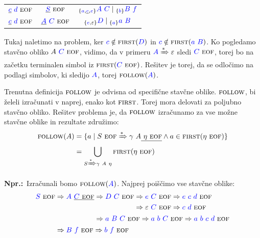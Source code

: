 \documentclass{article}
\newcommand{\Ex}{\textbf{Npr.:}\ }
\newcommand{\FIRST}{\textsc{first}}
\newcommand{\FOLLOW}{\textsc{follow}}
\newcommand{\EOF}{\textsc{eof}}
\newcommand{\Symbol}[1]{\textcolor{blue}{#1}}
\newcommand{\Null}{\varepsilon}
\newcommand{\Derive}{\Rightarrow}
\newcommand{\DeriveStar}{\xRightarrow{\ast}}
\newcommand{\Seq}{\ }
\newcommand{\Union}{\mathrel{|}}
\newcommand{\Lookahead}[1]{{}_{\{{#1}\}}}
\begin{document}
\begin{center}
\begin{tabular}{|c|c|c|}
  \hline
  $\underline{\Symbol{c}} \Seq \Symbol{d} \Seq \EOF$ & $\underline{\Symbol{S}} \Seq \EOF$ & $\Lookahead{\Symbol{a}, \underline{\Symbol{c}}, \Symbol{e}} \Symbol{A} \Seq \Symbol{C} \Union \Lookahead{\Symbol{b}} \Symbol{B} \Seq \Symbol{f}$ \\ 
  $\underline{\Symbol{c}} \Seq \Symbol{d} \Seq \EOF$ & $\underline{\Symbol{A}} \Seq \Symbol{C} \Seq \EOF$ & $\Lookahead{\Symbol{e}, \Null} \Symbol{D} \Union \Lookahead{\Symbol{a}} \Symbol{a} \Seq \Symbol{B}$ \\ 
  \hline
\end{tabular}
\end{center}
Tukaj naletimo na problem, ker $\Symbol{c} \notin \FIRST(\Symbol{D})$ in $\Symbol{c} \notin \FIRST(\Symbol{a} \Seq \Symbol{B})$.
Ko pogledamo stavčno obliko $A \Seq \Symbol{C} \Seq \EOF$, vidimo, da v primeru $\Symbol{A} \DeriveStar \varepsilon$ sledi $\Symbol{C} \Seq \EOF$, torej bo na začetku terminalen simbol iz $\FIRST(\Symbol{C} \Seq \EOF)$.
Rešitev je torej, da se odločimo na podlagi simbolov, ki sledijo $\Symbol{A}$, torej $\FOLLOW(\Symbol{A})$.

Trenutna definicija $\FOLLOW$ je odvisna od specifične stavčne oblike.
$\FOLLOW$, bi želeli izračunati v naprej, enako kot $\FIRST$.
Torej mora delovati za poljubno stavčno obliko.
Rešitev problema je, da $\FOLLOW$ izračunamo za vse možne stavčne oblike in rezultate združimo:
\begin{align*}
  \FOLLOW(A) &= \{a \mid S \Seq \EOF \DeriveStar \gamma \Seq A \underline{\Seq \eta \Seq \EOF} \land a \in \FIRST(\eta \Seq \EOF)\}\\
  &= \bigcup_{S \DeriveStar \gamma \Seq A \Seq \eta} \FIRST(\eta \Seq \EOF)
\end{align*}

\Ex Izračunali bomo $\FOLLOW(\Symbol{A})$.
Najprej poiščimo vse stavčne oblike:
\begin{equation*}
  \Symbol{S} \Seq \EOF \begin{aligned}[t]
    &\Derive \Symbol{A} \Seq \underline{\Symbol{C} \Seq \EOF} \begin{aligned}[t]
      &\Derive \Symbol{D} \Seq \Symbol{C} \Seq \EOF \begin{aligned}[t]
        &\Derive \Symbol{e} \Seq \Symbol{C} \Seq \EOF \Derive \Symbol{e} \Seq \Symbol{c} \Seq \Symbol{d} \Seq \EOF \\
        &\Derive \Null \Seq \Symbol{C} \Seq \EOF \Derive \Symbol{c} \Seq \Symbol{d} \Seq \EOF \\
      \end{aligned}\\
      &\Derive \Symbol{a} \Seq \Symbol{B} \Seq \Symbol{C} \Seq \EOF \Derive \Symbol{a} \Seq \Symbol{b} \Seq \Symbol{C} \Seq \EOF \Derive \Symbol{a} \Seq \Symbol{b} \Seq \Symbol{c} \Seq \Symbol{d} \Seq \EOF
    \end{aligned}\\
    &\Derive \Symbol{B} \Seq \Symbol{f} \Seq \EOF \Derive \Symbol{b} \Seq \Symbol{f} \Seq \EOF
  \end{aligned}
\end{equation*}
\end{document}
